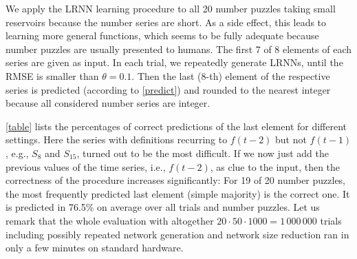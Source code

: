 \documentclass[twoside,11pt]{article}
\theoremstyle{definition}
\begin{document}
We apply the LRNN learning procedure to all 20 number puzzles taking small
reservoirs because the number series are short. As a side effect, this leads to
learning more general functions, which seems to be fully adequate because number
puzzles are usually presented to humans. The first 7 of 8 elements of each
series are given as input. In each trial, we repeatedly generate LRNNs, until the
RMSE is smaller than $\theta=0.1$. Then the last (8-th) element of the
respective series is predicted (according to \cref{predict}) and rounded to the
nearest integer because all considered number series are integer.

\cref{table} lists the percentages of correct predictions of the last
element for different settings. Here the series with definitions recurring to
$f(t-2)$ but not $f(t-1)$, e.g., $S_8$ and $S_{15}$, turned out to be the most
difficult. If we now just add the previous values of the time series, i.e., $f(t-2)$,
as clue to the input, then the correctness of the procedure increases
significantly: For 19 of 20 number puzzles, the most frequently predicted last
element (simple majority) is the correct one. It is predicted in 76.5\% on
average over all trials and number puzzles. Let us remark that the whole
evaluation with altogether $20 \cdot 50 \cdot 1000 = 1\,000\,000$ trials
including possibly repeated network generation and network size reduction ran in
only a few minutes on standard hardware.
\end{document}
